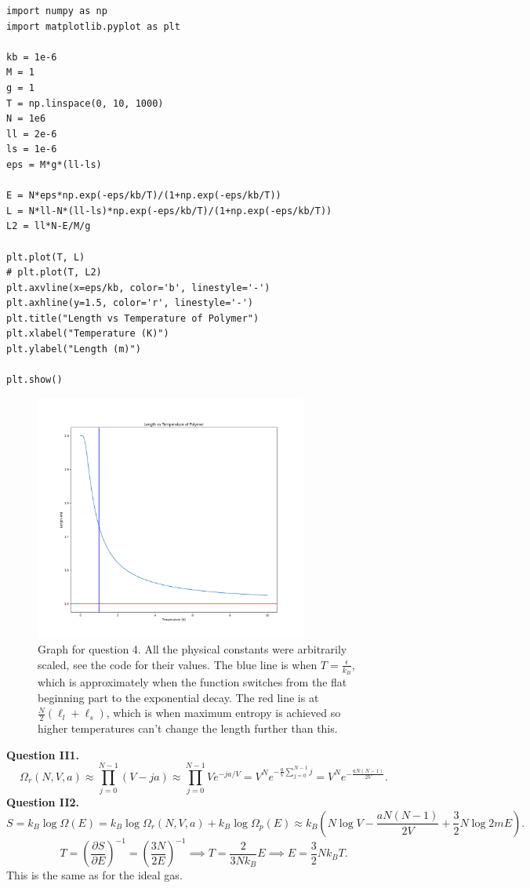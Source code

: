 \documentclass[letterpaper, reqno,11pt]{article}
\begin{document}
\begin{lstlisting}
import numpy as np
import matplotlib.pyplot as plt

kb = 1e-6
M = 1
g = 1
T = np.linspace(0, 10, 1000)
N = 1e6
ll = 2e-6
ls = 1e-6
eps = M*g*(ll-ls)

E = N*eps*np.exp(-eps/kb/T)/(1+np.exp(-eps/kb/T))
L = N*ll-N*(ll-ls)*np.exp(-eps/kb/T)/(1+np.exp(-eps/kb/T))
L2 = ll*N-E/M/g

plt.plot(T, L)
# plt.plot(T, L2)
plt.axvline(x=eps/kb, color='b', linestyle='-')
plt.axhline(y=1.5, color='r', linestyle='-')
plt.title("Length vs Temperature of Polymer")
plt.xlabel("Temperature (K)")
plt.ylabel("Length (m)")

plt.show()
\end{lstlisting}

\begin{figure}[htpb]
    \centering
    \includegraphics[width=0.8\textwidth]{q4}
    \caption{Graph for question 4. All the physical constants were arbitrarily scaled, see the code for their values. The blue line is when $T= \frac{\epsilon}{k_B}$, which is approximately when the function switches from the flat beginning part to the exponential decay. The red line is at $\frac{N}{2}\left( \ell_l+\ell_s\right) $, which is when maximum entropy is achieved so higher temperatures can't change the length further than this.}
    \label{fig:q4}
\end{figure}

{\medskip\noindent\bf Question II1.} 
\[
\Omega_r(N,V,a)\approx \prod_{j=0}^{N-1}(V-ja)\approx \prod_{j=0}^{N-1}Ve^{-ja /V}=V^{N}e^{-\frac{a}{V}\sum_{j=0}^{N-1}j}=V^{N}e^{-\frac{aN(N-1)}{2V}}
.\]
{\medskip\noindent\bf Question II2.} 
\[
S=k_B\log \Omega(E)=k_B\log\Omega_r(N,V,a)+k_B\log\Omega_p(E)\approx k_B\left( N\log V-\frac{aN(N-1)}{2V}+\frac{3}{2}N\log 2mE \right) 
.\]
\[
T=\left( \frac{\partial S}{\partial E} \right) ^{-1}=\left( \frac{3N}{2E} \right)^{-1}\implies T=\frac{2}{3Nk_B}E\implies E=\frac{3}{2}Nk_BT
.\]
This is the same as for the ideal gas.
\end{document}
